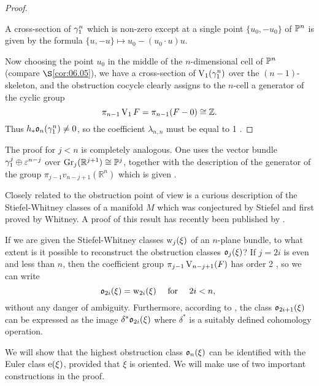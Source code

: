 \documentclass[../main]{subfiles}
\begin{document}
\begin{proof}
\begin{figure}[ht]
    \centering
    \caption{}
    \label{fig:figure9}
\end{figure}

A cross-section of $\gamma_{1}^{n}$ which is non-zero except at a single point $\{u_{0},-u_{0}\}$ of $\mathbb{P}^{n}$ is given by the formula $\{u,-u\} \mapsto u_{0}-(u_{0} \cdot u) u$.

\begin{figure}[ht]
    \centering
    \caption{}
    \label{fig:figure10}
\end{figure}

Now choosing the point $u_{0}$ in the middle of the $n$-dimensional cell of $\mathbb{P}^{n}$ (compare $\S$\ref{cor:06.05}), we have a cross-section of $\operatorname{V}_{1}(\gamma_{1}^{n})$ over the $(n-1)$-skeleton, and the obstruction cocycle clearly assigns to the $n$-cell a generator of the cyclic group
\[
\pi_{n-1} \operatorname{V}_{1} F=\pi_{n-1}(F-0) \cong \mathbb{Z}.
\]
Thus $h_{*} \mathfrak{o}_{n}(\gamma_{1}^{n}) \neq 0$, so the coefficient $\lambda_{n, n}$ must be equal to 1 .\end{proof}

The proof for $j<n$ is completely analogous. One uses the vector bundle $\gamma_{1}^{j} \oplus \varepsilon^{n-j}$ over $\operatorname{Gr}_{j}(\mathbb{R}^{j+1}) \cong \mathbb{P}^{j}$, together with the description of the generator of the group $\pi_{j-1} v_{n-j+1}(\mathbb{R}^{n})$ which is given \cite[\S25.6]{steenrod1951}. 

\begin{remark*}
Closely related to the obstruction point of view is a curious description of the Stiefel-Whitney classes of a manifold $M$ which was conjectured by Stiefel and first proved by Whitney. A proof of this result has recently been published by \cite{halperinToledo}.\end{remark*}

If we are given the Stiefel-Whitney classes $\operatorname{w}_{j}(\xi)$ of an $n$-plane bundle, to what extent is it possible to reconstruct the obstruction classes $\mathfrak{o}_{j}(\xi)$? If $j=2 i$ is even and less than $n$, then the coefficient group $\pi_{j-1} \operatorname{V}_{n-j+1}(F)$ has order 2 , so we can write
\[
\mathfrak{o}_{2 i}(\xi)=\operatorname{w}_{2 i}(\xi) \quad \text { for } \quad 2 i<n \text {, }
\]
without any danger of ambiguity. Furthermore, according to \cite[\S38.8]{steenrod1951}, the class $\mathfrak{o}_{2 i+1}(\xi)$ can be expressed as the image $\delta^{*} \mathfrak{o}_{2 i}(\xi)$ where $\delta^{*}$ is a suitably defined cohomology operation. 

We will show that the highest obstruction class $\mathfrak{o}_{n}(\xi)$ can be identified with the Euler class $\operatorname{e}(\xi)$, provided that $\xi$ is oriented. We will make use of two important constructions in the proof.
\end{document}
